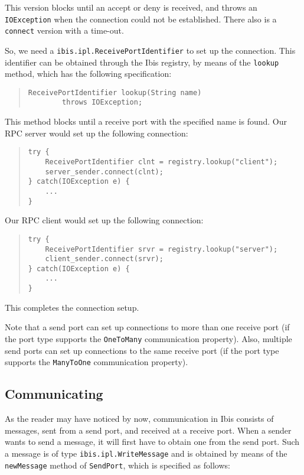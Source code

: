\documentclass[10pt]{article}
\newcommand{\mysubsection}[1]{\subsection{#1}\label{#1}}
\begin{document}
This version blocks until an accept or deny is received, and throws
an \verb+IOException+ when the connection could not be established.
There also is a \verb+connect+ version with a time-out.

So, we need a \verb+ibis.ipl.ReceivePortIdentifier+ to set up the
connection.
This identifier can be obtained through the Ibis registry, by
means of the \verb+lookup+ method, which has the following specification:

\begin{quote}
\begin{verbatim}
ReceivePortIdentifier lookup(String name)
        throws IOException;
\end{verbatim}
\end{quote}

This method blocks until a receive port with the specified name is found.
Our RPC server would set up the following connection:

\begin{quote}
\begin{verbatim}
try {
    ReceivePortIdentifier clnt = registry.lookup("client");
    server_sender.connect(clnt);
} catch(IOException e) {
    ...
}
\end{verbatim}
\end{quote}

Our RPC client would set up the following connection:

\begin{quote}
\begin{verbatim}
try {
    ReceivePortIdentifier srvr = registry.lookup("server");
    client_sender.connect(srvr);
} catch(IOException e) {
    ...
}
\end{verbatim}
\end{quote}

This completes the connection setup.

Note that a send port can set up connections to more than one
receive port (if the port type supports the \verb+OneToMany+
communication property). Also, multiple send ports can set up
connections to the same receive port (if the port type supports
the \verb+ManyToOne+ communication property).

\mysubsection{Communicating}

As the reader may have noticed by now, communication in Ibis
consists of messages, sent from a send port, and received at a
receive port. When a sender wants to send a message, it will first
have to obtain one from the send port. Such a message is of
type \verb+ibis.ipl.WriteMessage+ and is obtained by means of
the \verb+newMessage+ method of \verb+SendPort+, which is specified
as follows:
\end{document}
